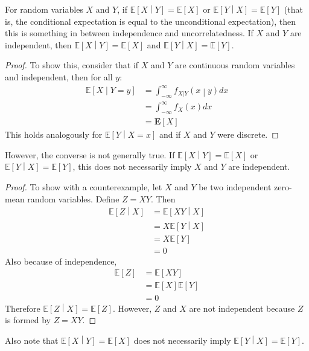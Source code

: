 \documentclass[11pt]{report} %
\begin{document}
For random variables $X$ and $Y$, if $\mathbb{E}\left[X\middle|Y\right] = \mathbb{E}\left[X\right]$ or $\mathbb{E}\left[Y\middle|X\right] = \mathbb{E}\left[Y\right]$ (that is, the conditional expectation is equal to the unconditional expectation), then this is something in between independence and uncorrelatedness. If $X$ and $Y$ are independent, then $\mathbb{E}\left[X\middle|Y\right] = \mathbb{E}\left[X\right]$ and $\mathbb{E}\left[Y\middle|X\right] = \mathbb{E}\left[Y\right]$.
\begin{proof}
To show this, consider that if $X$ and $Y$ are continuous random variables and independent, then for all $y$:
\begin{align}
\mathbb{E}\left[X\middle|Y = y\right] &= \int_{-\infty}^{\infty}f_{X|Y}\left(x\middle| y\right)dx \\
&= \int_{-\infty}^{\infty}f_{X}\left(x\right)dx \\
&= \mathbf{E}\left[X\right]
\end{align}
This holds analogously for $\mathbb{E}\left[Y\middle|X = x\right]$ and if $X$ and $Y$ were discrete. 
\end{proof}
However, the converse is not generally true. If $\mathbb{E}\left[X\middle|Y\right] = \mathbb{E}\left[X\right]$ or $\mathbb{E}\left[Y\middle|X\right] = \mathbb{E}\left[Y\right]$, this does not necessarily imply $X$ and $Y$ are independent.
\begin{proof}
To show with a counterexample, let $X$ and $Y$ be two independent zero-mean random variables. Define $Z = XY$. Then
\begin{align}
\mathbb{E}\left[Z\middle|X\right] &= \mathbb{E}\left[XY\middle|X\right] \\
&= X\mathbb{E}\left[Y\middle|X\right] \\
&= X\mathbb{E}\left[Y\right] \\
&= 0
\end{align}
Also because of independence,
\begin{align}
\mathbb{E}\left[Z\right] &= \mathbb{E}\left[XY\right] \\
&= \mathbb{E}\left[X\right]\mathbb{E}\left[Y\right] \\
&= 0
\end{align}
Therefore $\mathbb{E}\left[Z\middle|X\right] = \mathbb{E}\left[Z\right]$. However, $Z$ and $X$ are not independent because $Z$ is formed by $Z = XY$.
\end{proof}
Also note that $\mathbb{E}\left[X\middle|Y\right] = \mathbb{E}\left[X\right]$ does not necessarily imply $\mathbb{E}\left[Y\middle|X\right] = \mathbb{E}\left[Y\right]$.
\end{document}
